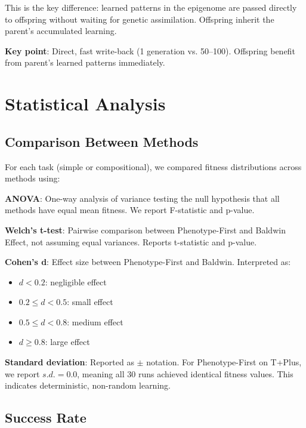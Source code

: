 \documentclass[twocolumn]{article}
\begin{document}
This is the key difference: learned patterns in the epigenome are passed directly to offspring without waiting for genetic assimilation. Offspring inherit the parent's accumulated learning.

\textbf{Key point}: Direct, fast write-back (1 generation vs. 50--100). Offspring benefit from parent's learned patterns immediately.


\section*{Statistical Analysis}

\subsection*{Comparison Between Methods}

For each task (simple or compositional), we compared fitness distributions across methods using:

\textbf{ANOVA}: One-way analysis of variance testing the null hypothesis that all methods have equal mean fitness. We report F-statistic and p-value.

\textbf{Welch's t-test}: Pairwise comparison between Phenotype-First and Baldwin Effect, not assuming equal variances. Reports t-statistic and p-value.

\textbf{Cohen's d}: Effect size between Phenotype-First and Baldwin. Interpreted as:
\begin{itemize}
\item $d < 0.2$: negligible effect
\item $0.2 \leq d < 0.5$: small effect
\item $0.5 \leq d < 0.8$: medium effect
\item $d \geq 0.8$: large effect
\end{itemize}

\textbf{Standard deviation}: Reported as $\pm$ notation. For Phenotype-First on T+Plus, we report $s.d. = 0.0$, meaning all 30 runs achieved identical fitness values. This indicates deterministic, non-random learning.

\subsection*{Success Rate}
\end{document}
